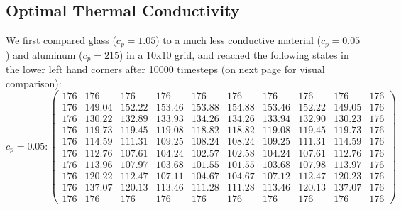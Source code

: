 \documentclass[12pt]{reedmcm}
\begin{document}
\subsection{Optimal Thermal Conductivity}
We first compared glass ($c_p = 1.05$) to a much less conductive material ($c_p = 0.05$) and aluminum ($c_p = 215$) in a 10x10 grid, and reached the following states in the lower left hand corners after 10000 timesteps (on next page for visual comparison):\newpage
\[c_p = 0.05: \begin{pmatrix} 176&176&176&176&176&176&176&176&176&176\\
176&149.04&152.22&153.46&153.88&154.88&153.46&152.22&149.05&176\\
176&130.22&132.89&133.93&134.26&134.26&133.94&132.90&130.23&176\\
176&119.73&119.45&119.08&118.82&118.82&119.08&119.45&119.73&176\\
176&114.59&111.31&109.25&108.24&108.24&109.25&111.31&114.59&176\\
176&112.76&107.61&104.24&102.57&102.58&104.24&107.61&112.76&176\\
176&113.96&107.97&103.68&101.55&101.55&103.68&107.98&113.97&176\\
176&120.22&112.47&107.11&104.67&104.67&107.12&112.47&120.23&176\\
176&137.07&120.13&113.46&111.28&111.28&113.46&120.13&137.07&176\\
176&176&176&176&176&176&176&176&176&176\end{pmatrix}\]
\end{document}
